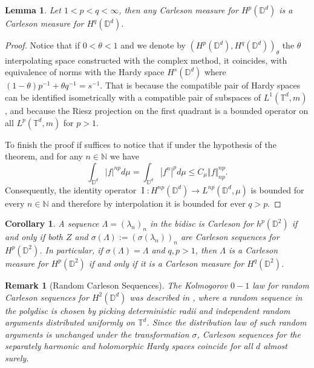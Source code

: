 \documentclass{amsart}
\numberwithin{equation}{section}
\newtheorem{coro}[thm]{Corollary}
\newtheorem{lem}[thm]{Lemma}
\newtheorem{rem}[thm]{Remark}
\DeclareMathOperator{\id}{I}
\begin{document}
\begin{lem}
\label{lemma:interpolation_carleson}
	Let $1 < p < q < \infty$, then any Carleson measure for $H^p(\mathbb{D}^d)$ is a Carleson measure for $H^q(\mathbb{D}^d).$   
\end{lem}
\begin{proof}
	Notice that if $0<\theta<1$ and we denote by $(H^p(\mathbb{D}^d),H^q(\mathbb{D}^d))_\theta$ the  $\theta$ interpolating space constructed with the complex method, it coincides, with equivalence of norms with the Hardy space $ H^s(\mathbb{D}^d) $ where $(1-\theta) p^{-1}+ \theta q^{-1}=s^{-1}$. That is because the compatible pair of Hardy spaces can be identified isometrically with a compatible pair of subspaces of $L^1(\mathbb{T}^d,m)$, and because the Riesz projection on the first quadrant is a bounded operator on all $L^p(\mathbb{T}^d,m)$ for $p>1$.

	To finish the proof if suffices to notice that if under the hypothesis of the theorem, and for any $n\in \mathbb{N}$ we have 
	\[ \int_{\mathbb{D}^d}|f|^{np}d\mu = \int_{\mathbb{D}^d}|f^n|^p d\mu \leq C_\mu \Vert f\Vert^{np}_{np}. \]
	Consequently, the identity operator $\id : H^{np}(\mathbb{D}^d)\to L^{np}(\mathbb{D}^d,\mu) $ is bounded for every $n\in \mathbb{N}$ and therefore by interpolation it is bounded for ever $q>p.$   
\end{proof}

 \begin{coro}
\label{coro:carlesonmeasures}
    A sequence $\Lambda =(\lambda_n)_n$ in the bidisc is Carleson for $h^p(\mathbb{D}^2)$ if and only if both $Z$ and $\sigma(\Lambda):=(\sigma(\lambda_n))_n$ are Carleson sequences for $H^p(\mathbb{D}^2)$. In particular, if $\sigma(\Lambda)= \Lambda$ and $q, p>1$, then $\Lambda$ is a Carleson measure for $H^p(\mathbb{D}^2)$ if and only if it is a Carleson measure for $H^q(\mathbb{D}^2)$.

\end{coro}
\begin{rem}[Random Carleson Sequences]
   The Kolmogorov  $0-1$ law for random Carleson sequences for $H^2(\mathbb{D}^d)$ was described in \cite{Chalmoukis2024}, where a random sequence in the polydisc is chosen by picking deterministic radii and independent random arguments distributed uniformly on $\mathbb{T}^d$. Since the distribution law of such random arguments is unchanged under the transformation $\sigma$,  Carleson sequences for the separately harmonic and holomorphic Hardy spaces coincide for all $d$ almost surely.
\end{rem}
\end{document}
